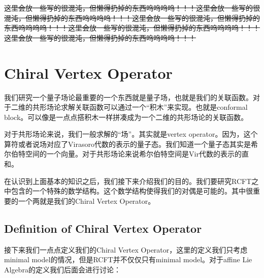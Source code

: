 \sout{这里会放一些写的很混沌，但懒得扔掉的东西呜呜呜呜！！！这里会放一些写的很混沌，但懒得扔掉的东西呜呜呜呜！！！这里会放一些写的很混沌，但懒得扔掉的东西呜呜呜呜！！！这里会放一些写的很混沌，但懒得扔掉的东西呜呜呜呜！！！这里会放一些写的很混沌，但懒得扔掉的东西呜呜呜呜！！！}



\section{Chiral Vertex Operator}
我们研究一个量子场论最重要的一个东西就是量子场，也就是我们的关联函数。对于二维的共形场论求解关联函数可以通过一个“积木”来实现。也就是conformal block。可以像是一点点搭积木一样拼凑成为一个二维的共形场论的关联函数。

对于共形场论来说，我们一般求解的“场”。其实就是vertex operator。因为，这个算符或者说场对应了Virasoro代数的表示的量子态。我们知道一个量子态其实是希尔伯特空间的一个向量。对于共形场论来说希尔伯特空间是Vir代数的表示的直和。

在认识到上面基本的知识之后，我们接下来介绍我们的目的。我们要研究RCFT之中包含的一个特殊的数学结构。这个数学结构使得我们的对偶是可能的。其中很重要的一个两就是我们的Chiral Vertex Operator。

\subsection{Definition of Chiral Vertex Operator}


接下来我们一点点定义我们的Chiral Vertex Operator，这里的定义我们只考虑minimal model的情况，但是RCFT并不仅仅只有minimal model。对于affine Lie Algebra的定义我们后面会进行讨论：


